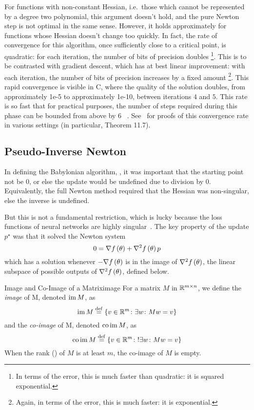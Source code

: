 \documentclass[../../thesis.tex]{subfiles}
\begin{document}
For functions with non-constant Hessian,
i.e.~those which cannot be represented by a degree two polynomial,
this argument doesn't hold,
and the pure Newton step is not optimal in the same sense.
However, it holds approximately for functions whose Hessian
doesn't change too quickly.
In fact, the rate of convergence for this algorithm,
once sufficiently close to a critical point,
is quadratic:
for each iteration, the number of bits of precision doubles%
\footnote{In terms of the error, this is much faster than quadratic:
it is squared exponential.}.
This is to be contrasted with gradient descent,
which has at best linear improvement:
with each iteration, the number of bits of precision increases by a fixed amount%
\footnote{Again, in terms of the error, this is much faster:
it is exponential.}.
This rapid convergence is visible in
C,
where the quality of the solution doubles,
from approximately 1e-5
to approximately 1e-10,
between iterations $4$ and $5$.
This rate is so fast that
for practical purposes,
the number of steps required during this phase
can be bounded from above by $6$%
~\cite[Section 9.5]{boyd2004}.
See~\cite[Chapters 2 \& 11]{nocedal2006}
for proofs of this convergence rate
in various settings
(in particular, Theorem 11.7).

\subsection{Pseudo-Inverse Newton}

In defining the Babylonian algorithm,
,
it was important that the starting point not be $0$,
or else the update would be undefined due to division by $0$.
Equivalently,
the full Newton method 
required that the Hessian was non-singular,
else the inverse is undefined.

But this is not a fundamental restriction,
which is lucky because the loss functions of neural networks
are highly singular~\cite{sagun2017}.
The key property of the update $p^\star$
was that it solved the Newton system
\begin{equation}\equationlabel{newtonsystem}
	0 = \grad{f}{\theta} + \hess{f}{\theta}p
\end{equation}
\noindent which has a solution whenever $-\nabla f\left(\theta\right)$
is in the image of $\nabla^2f\left(\theta\right)$,
the linear subspace of possible outputs of $\nabla^2f\left(\theta\right)$,
defined below.

\begin{definition}{Image and Co-Image of a Matrix}{image}
	For a matrix $M$ in $\mathbb{R}^{m \times n}$,
	we define the \emph{image} of M, denoted $\operatorname*{im} M$, as
	\begin{equation}
		\operatorname*{im} M \stackrel{\small \mathrm{def}}{=} \left\{v \in \mathbb{R}^m \colon \exists w \colon Mw=v\right\}
	\end{equation}
	and the \emph{co-image} of M, denoted $\operatorname*{co}\operatorname*{im} M$, as
	\begin{equation}
		\operatorname*{co}\operatorname*{im} M \stackrel{\small \mathrm{def}}{=} \left\{v \in \mathbb{R}^m \colon !\exists w \colon Mw=v\right\}
	\end{equation}
	When the rank () of $M$ is at least $m$,
	the co-image of $M$ is empty.
\end{definition}
\end{document}
